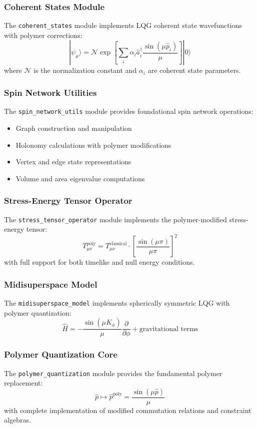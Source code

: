 \documentclass[11pt]{article}
\begin{document}
\subsubsection{Coherent States Module}
The \texttt{coherent\_states} module implements LQG coherent state wavefunctions with polymer corrections:
\[
|\psi_{\mu}\rangle = \mathcal{N} \exp\left[\sum_{i} \alpha_i \hat{a}_i^{\dagger} \frac{\sin(\mu \hat{p}_i)}{\mu}\right] |0\rangle
\]
where $\mathcal{N}$ is the normalization constant and $\alpha_i$ are coherent state parameters.

\subsubsection{Spin Network Utilities}
The \texttt{spin\_network\_utils} module provides foundational spin network operations:
\begin{itemize}
\item Graph construction and manipulation
\item Holonomy calculations with polymer modifications
\item Vertex and edge state representations
\item Volume and area eigenvalue computations
\end{itemize}

\subsubsection{Stress-Energy Tensor Operator}
The \texttt{stress\_tensor\_operator} module implements the polymer-modified stress-energy tensor:
\[
T_{\mu\nu}^{\text{poly}} = T_{\mu\nu}^{\text{classical}} \cdot \left[\frac{\sin(\mu \pi)}{\mu \pi}\right]^2
\]
with full support for both timelike and null energy conditions.

\subsubsection{Midisuperspace Model}
The \texttt{midisuperspace\_model} implements spherically symmetric LQG with polymer quantization:
\[
\hat{H} = -\frac{\sin(\mu K_\phi)}{\mu} \frac{\partial}{\partial \phi} + \text{gravitational terms}
\]

\subsubsection{Polymer Quantization Core}
The \texttt{polymer\_quantization} module provides the fundamental polymer replacement:
\[
\hat{p} \mapsto \hat{p}^{\text{poly}} = \frac{\sin(\mu \hat{p})}{\mu}
\]
with complete implementation of modified commutation relations and constraint algebras.
\end{document}
